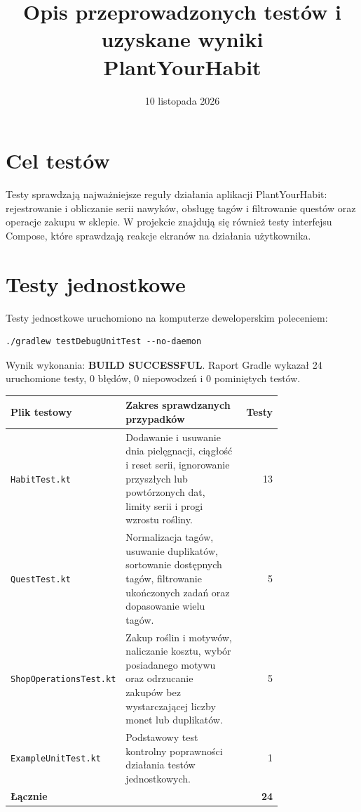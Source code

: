 \documentclass[a4paper,12pt]{article}
\title{Opis przeprowadzonych testów i uzyskane wyniki\\PlantYourHabit}
\date{10 listopada 2026}
\begin{document}
\maketitle

\section{Cel testów}
Testy sprawdzają najważniejsze reguły działania aplikacji PlantYourHabit: rejestrowanie i obliczanie serii nawyków, obsługę tagów i filtrowanie questów oraz operacje zakupu w sklepie. W projekcie znajdują się również testy interfejsu Compose, które sprawdzają reakcje ekranów na działania użytkownika.

\section{Testy jednostkowe}
Testy jednostkowe uruchomiono na komputerze deweloperskim poleceniem:
\begin{verbatim}
./gradlew testDebugUnitTest --no-daemon
\end{verbatim}

Wynik wykonania: \textbf{BUILD SUCCESSFUL}. Raport Gradle wykazał 24 uruchomione testy, 0 błędów, 0 niepowodzeń i 0 pominiętych testów.

\begin{center}
\begin{tabular}{@{}p{0.34\linewidth}p{0.43\linewidth}r@{}}
\toprule
\textbf{Plik testowy} & \textbf{Zakres sprawdzanych przypadków} & \textbf{Testy} \\
\midrule
\texttt{HabitTest.kt} &
Dodawanie i usuwanie dnia pielęgnacji, ciągłość i reset serii, ignorowanie przyszłych lub powtórzonych dat, limity serii i progi wzrostu rośliny. & 13 \\
\texttt{QuestTest.kt} &
Normalizacja tagów, usuwanie duplikatów, sortowanie dostępnych tagów, filtrowanie ukończonych zadań oraz dopasowanie wielu tagów. & 5 \\
\texttt{ShopOperationsTest.kt} &
Zakup roślin i motywów, naliczanie kosztu, wybór posiadanego motywu oraz odrzucanie zakupów bez wystarczającej liczby monet lub duplikatów. & 5 \\
\texttt{ExampleUnitTest.kt} &
Podstawowy test kontrolny poprawności działania testów jednostkowych. & 1 \\
\midrule
\textbf{Łącznie} & & \textbf{24} \\
\bottomrule
\end{tabular}
\end{center}
\end{document}
